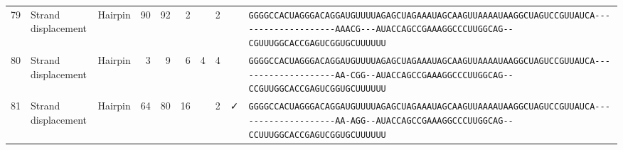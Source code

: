 \begin{tabular}{rllrrrrrcl}
 79 & Strand displacement & Hairpin & 90 & 92 & 2 &   & 2 &  &                                                                                                                                                     
 \color{ucsfdarkgrey}\verb|GGGGCCACUAGGGACAGGAU|\color{ucsforange}\verb|GUUUUA|\color{ucsfblue}\verb|GAGCUAGAAAUAGCAAGU|\color{ucsforange}\verb|UAAAAUAA|\color{ucsfnavy}\verb|GGCUAGUCC|\color{ucsforange}\verb|GUUAUCA|\color{ucsfteal}\verb|--------------------AAACG---|\color{ucsfpurple}\verb|AUACCAGCCGAAAGGCCCUUGGCAG|\color{ucsfteal}\verb|--CGUUU|\color{ucsforange}\verb|GGCACCGAGUCGGUGCUUUUUU| \\
                                                                                                                                                                                                                   
 80 & Strand displacement & Hairpin & 3 & 9 & 6 & 4 & 4 &  &                                                                                                                                                       
 \color{ucsfdarkgrey}\verb|GGGGCCACUAGGGACAGGAU|\color{ucsforange}\verb|GUUUUA|\color{ucsfblue}\verb|GAGCUAGAAAUAGCAAGU|\color{ucsforange}\verb|UAAAAUAA|\color{ucsfnavy}\verb|GGCUAGUCC|\color{ucsforange}\verb|GUUAUCA|\color{ucsfteal}\verb|--------------------AA-CGG--|\color{ucsfpurple}\verb|AUACCAGCCGAAAGGCCCUUGGCAG|\color{ucsfteal}\verb|--CCGUU|\color{ucsforange}\verb|GGCACCGAGUCGGUGCUUUUUU| \\
                                                                                                                                                                                                                   
 81 & Strand displacement & Hairpin & 64 & 80 & 16 &   & 2 & ✓ &                                                                                                                                                   
 \color{ucsfdarkgrey}\verb|GGGGCCACUAGGGACAGGAU|\color{ucsforange}\verb|GUUUUA|\color{ucsfblue}\verb|GAGCUAGAAAUAGCAAGU|\color{ucsforange}\verb|UAAAAUAA|\color{ucsfnavy}\verb|GGCUAGUCC|\color{ucsforange}\verb|GUUAUCA|\color{ucsfteal}\verb|--------------------AA-AGG--|\color{ucsfpurple}\verb|AUACCAGCCGAAAGGCCCUUGGCAG|\color{ucsfteal}\verb|--CCUUU|\color{ucsforange}\verb|GGCACCGAGUCGGUGCUUUUUU| \\
                                                                                                                                                                                                                   

\end{tabular}
